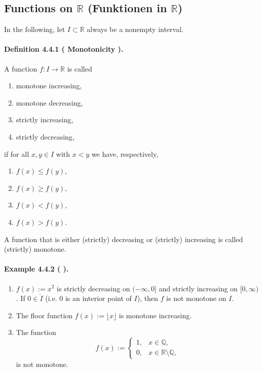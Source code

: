 \documentclass[12pt]{article}
\author{Based on original German script (private use)}
\date{\today}
\newcommand{\Q}{\mathbb{Q}}
\newcommand{\R}{\mathbb{R}}
\newcommand{\NumberedDefinition}[3]{%
\paragraph*{Definition #1 ( #2 ).} #3\par}
\newcommand{\NumberedExample}[3]{%
\paragraph*{Example #1 ( #2 ).} #3\par}
\begin{document}
\subsection{Functions on \texorpdfstring{$\R$}{R} (Funktionen in \texorpdfstring{$\R$}{R})}

In the following, let $I\subset\R$ always be a nonempty interval.

\NumberedDefinition{4.4.1}{Monotonicity}{A function $f:I\to\R$ is called
\begin{enumerate}[label={(\arabic*)}, leftmargin=*]
	\item monotone increasing,
	\item monotone decreasing,
	\item strictly increasing,
	\item strictly decreasing,
\end{enumerate}
if for all $x,y\in I$ with $x<y$ we have, respectively,
\begin{enumerate}[label={(\arabic*)}, leftmargin=*]
	\item $f(x)\le f(y)$,
	\item $f(x)\ge f(y)$,
	\item $f(x)< f(y)$,
	\item $f(x)> f(y)$.
\end{enumerate}
A function that is either (strictly) decreasing or (strictly) increasing is called (strictly) monotone.}

\NumberedExample{4.4.2}{}{{\leavevmode}
\begin{enumerate}[label={(\arabic*)}, leftmargin=*]
	\item $f(x):=x^{2}$ is strictly decreasing on $(-\infty,0]$ and strictly increasing on $[0,\infty)$. If $0\in \mathring I$ (i.e. $0$ is an interior point of $I$), then $f$ is not monotone on $I$.
	\item The floor function $f(x):=\lfloor x\rfloor$ is monotone increasing.
	\item The function
		\[
			f(x):=\begin{cases}
				1, & x\in\Q,\\
				0, & x\in\R\setminus\Q,
			\end{cases}
		\]
		is not monotone.
\end{enumerate}}
\end{document}
